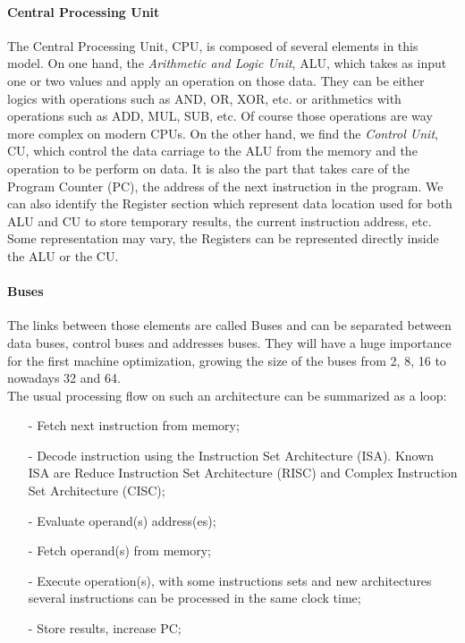 \paragraph{Central Processing Unit}
The Central Processing Unit, CPU, is composed of several elements in this model. 
On one hand, the \textit{Arithmetic and Logic Unit}, ALU, which takes as input one or two values and apply an operation on those data. 
They can be either logics with operations such as AND, OR, XOR, etc. or arithmetics with operations such as ADD, MUL, SUB, etc. 
Of course those operations are way more complex on modern CPUs. 
On the other hand, we find the \textit{Control Unit}, CU, which control the data carriage to the ALU from the memory and the operation to be perform on data.
It is also the part that takes care of the Program Counter (PC), the address of the next instruction in the program. 
We can also identify the Register section which represent data location used for both ALU and CU to store temporary results, the current instruction address, etc. 
Some representation may vary, the Registers can be represented directly inside the ALU or the CU. 
\paragraph{Buses}
The links between those elements are called Buses and can be separated between data buses, control buses and addresses buses.
They will have a huge importance for the first machine optimization, growing the size of the buses from 2, 8, 16 to nowadays 32 and 64.\\

The usual processing flow on such an architecture can be summarized as a loop: 
\begin{itemize}[noitemsep,nolistsep]
\item[-] Fetch next instruction from memory;
\item[-] Decode instruction using the Instruction Set Architecture (ISA). Known ISA are Reduce Instruction Set Architecture (RISC) and Complex Instruction Set Architecture (CISC);
\item[-] Evaluate operand(s) address(es);
\item[-] Fetch operand(s) from memory;
\item[-] Execute operation(s), with some instructions sets and new architectures several instructions can be processed in the same clock time;
\item[-] Store results, increase PC; 
\end{itemize}

